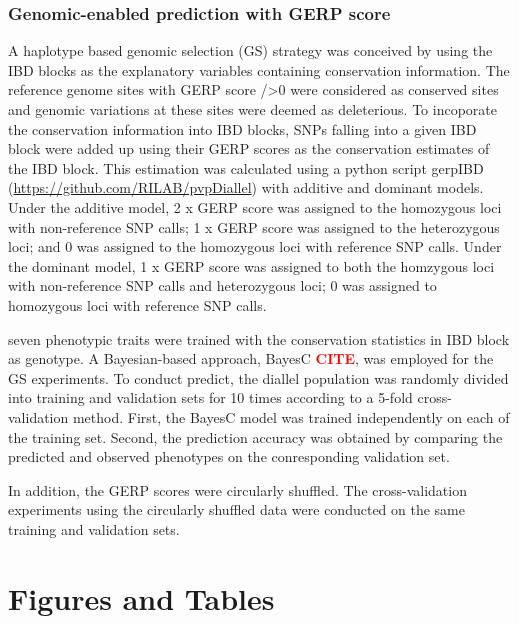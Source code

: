 \documentclass[10pt]{article}
\newcommand{\sme}[1]{\textcolor{red}{\bf #1}}
\begin{document}
\subsubsection*{Genomic-enabled prediction with GERP score}

A haplotype based genomic selection (GS) strategy was conceived by using the IBD blocks as the explanatory variables containing conservation information. The reference genome sites with GERP score />0 were considered as conserved sites and genomic variations at these sites were deemed as deleterious. To incoporate the conservation information into IBD blocks, SNPs falling into a given IBD block were added up using their GERP scores as the conservation estimates of the IBD block. This estimation was calculated using a python script gerpIBD (\url{https://github.com/RILAB/pvpDiallel}) with additive and dominant models. Under the additive model, 2 x GERP score was assigned to the homozygous loci with non-reference SNP calls; 1 x GERP score was assigned to the heterozygous loci; and 0 was assigned to the homozygous loci with reference SNP calls. Under the dominant model, 1 x GERP score was assigned to both the homzygous loci with non-reference SNP calls and heterozygous loci; 0 was assigned to homozygous loci with reference SNP calls.



seven phenotypic traits were trained with the conservation statistics in IBD block as genotype.
A Bayesian-based approach, BayesC \sme{CITE}, was employed for the GS experiments. To conduct predict, the diallel population was randomly divided into training and validation sets for 10 times according to a 5-fold cross-validation method. First, the BayesC model was trained independently on each of the training set. Second, the prediction accuracy was obtained by comparing the predicted and observed phenotypes on the conresponding validation set. 


In addition, the GERP scores were circularly shuffled. The cross-validation experiments using the circularly shuffled data were conducted on the same training and validation sets.  


\clearpage



\pagebreak
\section*{Figures and Tables}
\end{document}
